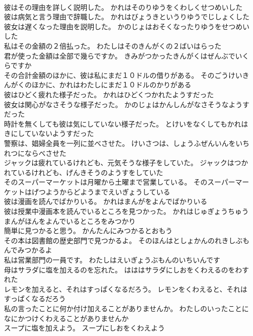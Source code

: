 \documentclass[8pt]{extreport}
\begin{document}
\begin{CJK}{UTF8}{min}
\\	彼はその理由を詳しく説明した。	かれはそのりゆうをくわしくせつめいした 
\\	彼は病気と言う理由で辞職した。	かれはびょうきというりゆうでじしょくした 
\\	彼女は遅くなった理由を説明した。	かのじょはおそくなったりゆうをせつめいした 
\\	私はその金額の２倍払った。	わたしはそのきんがくの２ばいはらった 
\\	君が使った金額は全部で幾らですか。	きみがつかったきんがくはぜんぶでいくらですか 
\\	その合計金額のほかに、彼は私にまだ１０ドルの借りがある。	そのごうけいきんがくのほかに、かれはわたしにまだ１０ドルのかりがある 
\\	彼はひどく疲れた様子だった。	かれはひどくつかれたようすだった 
\\	彼女は関心がなさそうな様子だった。	かのじょはかんしんがなさそうなようすだった 
\\	時計を無くしても彼は気にしていない様子だった。	とけいをなくしてもかれはきにしていないようすだった 
\\	警察は、娼婦全員を一列に並べさせた。	けいさつは、しょうふぜんいんをいちれつにならべさせた 
\\	ジャックは疲れているけれども、元気そうな様子をしていた。	ジャックはつかれているけれども、げんきそうのようすをしていた 
\\	そのスーパーマーケットは月曜から土曜まで営業している。	そのスーパーマーケットはげつようからどようまでえいぎょうしている 
\\	彼は漫画を読んでばかりいる。	かれはまんがをよんでばかりいる 
\\	彼は授業中漫画本を読んでいるところを見つかった。	かれはじゅぎょうちゅうまんがほんをよんでいるところをみつかり 
\\	簡単に見つかると思う。	かんたんにみつかるとおもう 
\\	その本は図書館の歴史部門で見つかるよ。	そのほんはとしょかんのれきしぶもんでみつかるよ 
\\	私は営業部門の一員です。	わたしはえいぎょうぶもんのいちいんです 
\\	母はサラダに塩を加えるのを忘れた。	はははサラダにしおをくわえるのをわすれた 
\\	レモンを加えると、それはすっぱくなるだろう。	レモンをくわえると、それはすっぱくなるだろう 
\\	私の言ったことに何か付け加えることがありませんか。	わたしのいったことになにかつけくわえることがありませんか 
\\	スープに塩を加えよう。	スープにしおをくわえよう 

\end{CJK}
\end{document}
